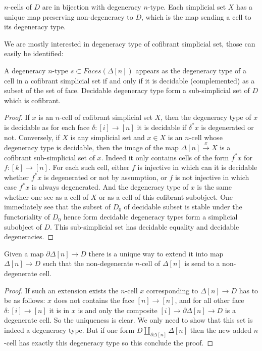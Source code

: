 \documentclass[reqno,10pt,a4paper,oneside,draft]{amsart}
\begin{document}
\begin{lemma}
$n$-cells of $D$ are in bijection with degeneracy $n$-type. Each simplicial set $X$ has a unique map preserving non-degeneracy to $D$, which is the map sending a cell to its degeneracy type.
\end{lemma}




We are mostly interested in degeneracy type of cofibrant simplicial set, those can easily be identified:

\begin{lemma}
A degeneracy $n$-type $s \subset Faces(\Delta[n])$ appears as the degeneracy type of a cell in a cofibrant simplicial set if and only if it is decidable (complemented) as a subset of the set of face. Decidable degeneracy type form a sub-simplicial set of $D$ which is cofibrant.
\end{lemma}

\begin{proof}
If $x$ is an $n$-cell of cofibrant simplicial set $X$, then the degeneracy type of $x$ is decidable as for each face $\delta:[i] \rightarrow [n]$ it is decidable if $\delta^* x $ is degenerated or not.
Conversely, if $X$ is any simplicial set and $x \in X$ is an $n$-cell whose degeneracy type is decidable, then the image of the map $\Delta[n] \overset{x}{\rightarrow} X$ is a cofibrant sub-simplicial set of $x$. Indeed it only contains cells of the form $f^*x$ for $f:[k] \rightarrow [n]$. For each such cell, either $f$ is injective in which can it is decidable whether $f^*x$ is degenerated or not by assumption, or $f$ is not injective in which case $f^*x$ is always degenerated. And the degeneracy type of $x$ is the same whether one see as a cell of $X$ or as a cell of this cofibrant subobject.
One immediately see that the subset of $D_0$ of decidable subset is stable under the functoriality of $D_0$ hence form decidable degeneracy types form a simplicial subobject of $D$. This sub-simplicial set has decidable equality and decidable degeneracies.
\end{proof}

\begin{lemma}

Given a map $\partial \Delta[n] \rightarrow D$ there is a unique way to extend it into map $\Delta[n] \rightarrow D$ such that the non-degenerate $n$-cell of $\Delta[n]$ is send to a non-degenerate cell.
\end{lemma}

\begin{proof}
If such an extension exists the $n$-cell $x$ corresponding to $\Delta[n] \rightarrow D$ has to be as follows: $x$ does not contains the face $[n] \rightarrow [n]$, and for all other face $\delta:[i] \rightarrow [n]$ it is in $x$ is and only the composite $[i] \rightarrow \partial \Delta[n] \rightarrow D$ is a degenerate cell. So the uniqueness is clear. We only need to show that this set is indeed a degeneracy type. But if one form $D \coprod_{\partial \Delta[n]} \Delta[n]$ then the new added $n$-cell has exactly this degeneracy type so this conclude the proof.
\end{proof}
\end{document}
